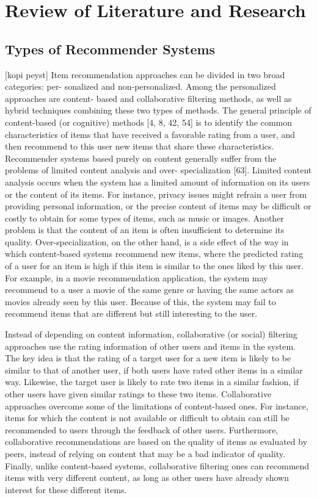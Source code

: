
\chapter{Review of Literature and Research}\label{chapter:review_of_research}

\section{Types of Recommender Systems}
[kopi peyst]
Item recommendation approaches can be divided in two broad categories: per- sonalized and non-personalized. Among the personalized approaches are content- based and collaborative filtering methods, as well as hybrid techniques combining these two types of methods. The general principle of content-based (or cognitive) methods [4, 8, 42, 54] is to identify the common characteristics of items that have received a favorable rating from a user, and then recommend to this user new items that share these characteristics. Recommender systems based purely on content generally suffer from the problems of limited content analysis and over- specialization [63]. Limited content analysis occurs when the system has a limited amount of information on its users or the content of its items. For instance, privacy issues might refrain a user from providing personal information, or the precise content of items may be difficult or costly to obtain for some types of items, such as music or images. Another problem is that the content of an item is often insufficient to determine its quality. Over-specialization, on the other hand, is a side effect of the way in which content-based systems recommend new items, where the predicted rating of a user for an item is high if this item is similar to the ones liked by this user. For example, in a movie recommendation application, the system may recommend to a user a movie of the same genre or having the same actors as movies already seen by this user. Because of this, the system may fail to recommend items that are different but still interesting to the user.

Instead of depending on content information, collaborative (or social) filtering approaches use the rating information of other users and items in the system. The key idea is that the rating of a target user for a new item is likely to be similar to that of another user, if both users have rated other items in a similar way. Likewise, the target user is likely to rate two items in a similar fashion, if other users have given similar ratings to these two items. Collaborative approaches overcome some of the limitations of content-based ones. For instance, items for which the content is not available or difficult to obtain can still be recommended to users through the feedback of other users. Furthermore, collaborative recommendations are based on the quality of items as evaluated by peers, instead of relying on content that may be a bad indicator of quality. Finally, unlike content-based systems, collaborative filtering ones can recommend items with very different content, as long as other users have already shown interest for these different items.

